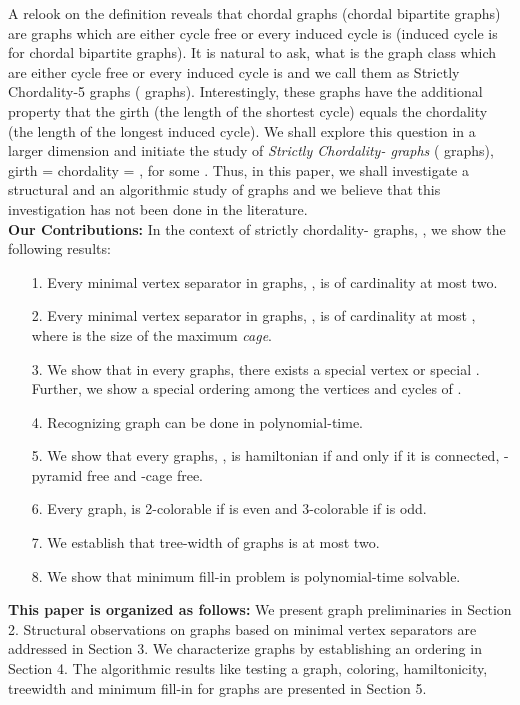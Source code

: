 \documentclass[runningheads]{llncs}
\begin{document}
A relook on the definition reveals that chordal graphs (chordal bipartite graphs) are graphs which are either cycle free or every induced cycle is  (induced cycle is  for chordal bipartite graphs). It is natural to ask, what is the graph class which are either cycle free or every induced cycle is  and we call them as Strictly Chordality-5 graphs ( graphs). Interestingly, these graphs have the additional property that the girth (the length of the shortest cycle) equals the chordality (the length of the longest induced cycle). We shall explore this question in a larger dimension and initiate the study of \emph{Strictly Chordality- graphs} ( graphs), girth = chordality = , for some . Thus, in this paper, we shall investigate a structural and an algorithmic study of  graphs and we believe that this investigation has not been done in the literature.\\
\textbf{Our Contributions:} In the context of strictly chordality- graphs, , we show the following results: 
\begin{itemize}
\item[1.] Every minimal vertex separator in  graphs, , is of cardinality at most two.
\item[2.] Every minimal vertex separator in  graphs, , is of cardinality at most , where  is the size of the maximum \emph{cage}. 
\item[3.] We show that in every  graphs, there exists a special vertex or special . Further, we show a special ordering among the vertices and cycles of .
\item[4.] Recognizing  graph can be done in polynomial-time.
\item[5.] We show that every  graphs, , is hamiltonian if and only if it is connected, - pyramid free and -cage free.
\item[6.] Every  graph,  is 2-colorable if  is even and 3-colorable if  is odd.
\item[7.] We establish that tree-width of  graphs is at most two.
\item[8.] We show that minimum fill-in problem is polynomial-time solvable.
\end{itemize}
\textbf{This paper is organized as follows:} We present graph preliminaries in Section 2. Structural observations on  graphs based on minimal vertex separators are addressed in Section 3. We characterize  graphs by establishing an ordering in Section 4.  The algorithmic results like testing a graph, coloring, hamiltonicity, treewidth and minimum fill-in for  graphs are presented in Section 5.
\end{document}
